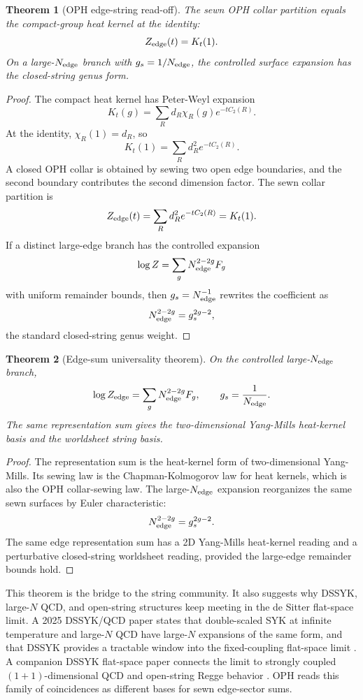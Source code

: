 \documentclass[11pt]{article}
\newtheorem{theorem}{Theorem}[section]
\theoremstyle{remark}
\theoremstyle{plain}
\begin{document}
\begin{theorem}[OPH edge-string read-off]
The sewn OPH collar partition equals the compact-group heat kernel at the identity:
\[
Z_{\rm edge}(t)=K_t(1).
\]
On a large-\(N_{\rm edge}\) branch with \(g_s=1/N_{\rm edge}\), the controlled surface expansion
has the closed-string genus form.
\end{theorem}

\begin{proof}
The compact heat kernel has Peter-Weyl expansion
\[
K_t(g)=\sum_R d_R\chi_R(g)e^{-tC_2(R)}.
\]
At the identity, \(\chi_R(1)=d_R\), so
\[
K_t(1)=\sum_R d_R^2e^{-tC_2(R)}.
\]
A closed OPH collar is obtained by sewing two open edge boundaries, and the second boundary
contributes the second dimension factor. The sewn collar partition is
\[
Z_{\rm edge}(t)=\sum_R d_R^2e^{-tC_2(R)}=K_t(1).
\]
If a distinct large-edge branch has the controlled expansion
\[
\log Z=\sum_g N_{\rm edge}^{2-2g}F_g
\]
with uniform remainder bounds, then \(g_s=N_{\rm edge}^{-1}\) rewrites the coefficient as
\[
N_{\rm edge}^{2-2g}=g_s^{2g-2},
\]
the standard closed-string genus weight.
\end{proof}

\begin{theorem}[Edge-sum universality theorem]
On the controlled large-\(N_{\rm edge}\) branch,
\[
\log Z_{\rm edge}
=
\sum_g N_{\rm edge}^{2-2g}F_g,
\qquad
g_s=\frac1{N_{\rm edge}}.
\]
The same representation sum gives the two-dimensional Yang-Mills heat-kernel basis and the
worldsheet string basis.
\end{theorem}

\begin{proof}
The representation sum is the heat-kernel form of two-dimensional Yang-Mills. Its sewing law is the
Chapman-Kolmogorov law for heat kernels, which is also the OPH collar-sewing law. The
large-\(N_{\rm edge}\) expansion reorganizes the same sewn surfaces by Euler characteristic:
\[
N_{\rm edge}^{2-2g}=g_s^{2g-2}.
\]
The same edge representation sum has a 2D Yang-Mills heat-kernel reading and a perturbative
closed-string worldsheet reading, provided the large-edge remainder bounds hold.
\end{proof}

This theorem is the bridge to the string community. It also suggests why DSSYK, large-\(N\) QCD,
and open-string structures keep meeting in the de Sitter flat-space limit. A 2025 DSSYK/QCD paper
states that double-scaled SYK at infinite temperature and large-\(N\) QCD have large-\(N\)
expansions of the same form, and that DSSYK provides a tractable window into the fixed-coupling
flat-space limit \cite{DSSYKQCDPaper}. A companion DSSYK flat-space paper connects the limit to
strongly coupled \((1+1)\)-dimensional QCD and open-string Regge behavior \cite{DSSYKFlatPaper}.
OPH reads this family of coincidences as different bases for sewn edge-sector sums.
\end{document}
